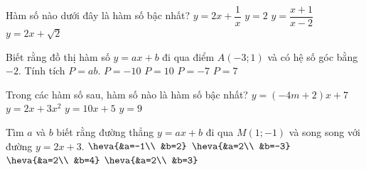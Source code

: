

\begin{ex}%
	 Hàm số nào dưới đây là hàm số bậc nhất?
	\choice 
		 {$y=2x+\dfrac{1}{x}$}
		 {$y=2$}
		 {$y=\dfrac{x+1}{x-2}$}
		{\True $y=2x+\sqrt{2}$} 
\end{ex}

\begin{ex}%
	Biết rằng đồ  thị hàm số $y=ax+b$ đi qua điểm $A(-3;1)$ và có hệ số góc bằng $-2$. Tính tích $P=ab$.
	 \choice
		 {$P=-10$}
		 {\True $P=10$}
		{$P=-7$} 
		 {$P=7$}
\end{ex}

\begin{ex}%
	Trong các hàm  số sau, hàm số nào là hàm số bậc nhất?
	\choice 
		{$y=(-4m+2)x+7$} 
		{$y=2x+3x^2$} 
		 {\True $y=10x+5$}
		{$y=9$} 
\end{ex}

\begin{ex}%
	Tìm $a$ và $b$ biết rằng đường thẳng $y=ax+b$ đi qua $M(1;-1)$ và song song với  đường $y=2x+3$.
	\choice 
		{$\heva{&a=-1\\  &b=2}$}
		{\True $\heva{&a=2\\  &b=-3}$}
		{$\heva{&a=2\\  &b=4}$}
		{$\heva{&a=2\\  &b=3}$}
\end{ex}

